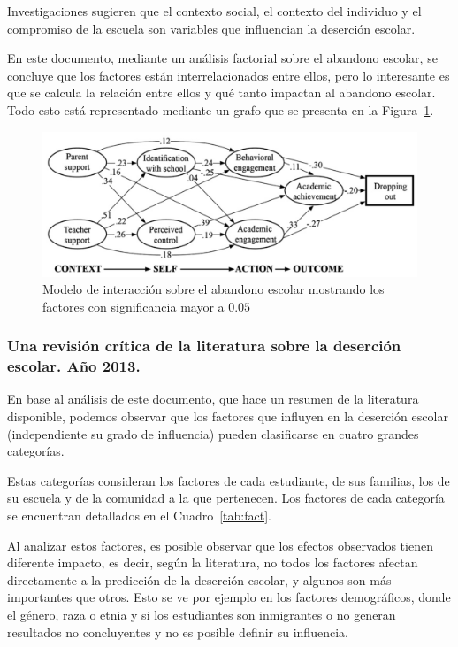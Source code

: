 Investigaciones sugieren que el contexto social, el contexto del individuo y el compromiso de la escuela son variables que influencian la deserción escolar.

En este documento, mediante un análisis factorial sobre el abandono escolar, se concluye que los factores están interrelacionados entre ellos, pero lo interesante es que se calcula la relación entre ellos y qué tanto impactan al abandono escolar. Todo esto está representado mediante un grafo que se presenta en la Figura~\ref{fig:domodel}.

\begin{figure}[H]
  \centering
    \includegraphics[width=1\textwidth]{Figuras/dropoutmodel}
      \caption{Modelo de interacción sobre el abandono escolar mostrando los factores con significancia mayor a $0.05$\cite{hsdropout}}
    \label{fig:domodel}
\end{figure}

\subsubsection{Una revisión crítica de la literatura sobre la deserción escolar. Año 2013.}

En base al análisis de este documento, que hace un resumen de la literatura disponible, podemos observar que los factores que influyen en la deserción escolar (independiente su grado de influencia) pueden clasificarse en cuatro grandes categorías. 

Estas categorías consideran los factores de cada estudiante, de sus familias, los de su escuela y de la comunidad a la que pertenecen. Los factores de cada categoría se encuentran detallados en el Cuadro~\ref{tab:fact}.

Al analizar estos factores, es posible observar que los efectos observados tienen diferente impacto, es decir, según la literatura, no todos los factores afectan directamente a la predicción de la deserción escolar, y algunos son más importantes que otros. Esto se ve por ejemplo en los factores demográficos, donde el género, raza o etnia y si los estudiantes son inmigrantes o no generan resultados no concluyentes y no es posible definir su influencia.

